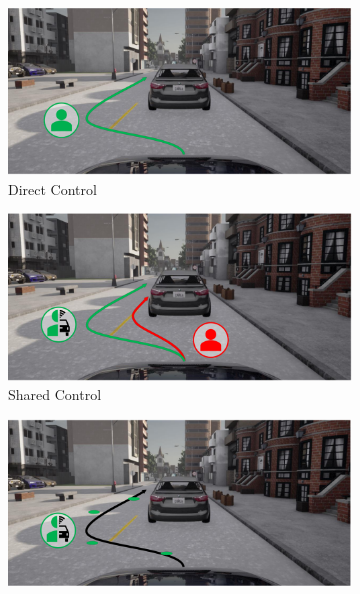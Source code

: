 \begin{figure}[h]
    \centering
    \begin{subfigure}[b]{0.48\textwidth}
        \centering
        \includegraphics[width=\textwidth]{figures/directcont.png}
        \caption{Direct Control}
        \label{fig:direct_control}
    \end{subfigure}
    \hfill
    \begin{subfigure}[b]{0.48\textwidth}
        \centering
        \includegraphics[width=\textwidth]{figures/sharedcont.png}
        \caption{Shared Control}
        \label{fig:shared_control}
    \end{subfigure}
    \begin{subfigure}[b]{0.48\textwidth}
        \centering
        \includegraphics[width=\textwidth]{figures/wayguid.png}

\end{subfigure}
\end{figure}
